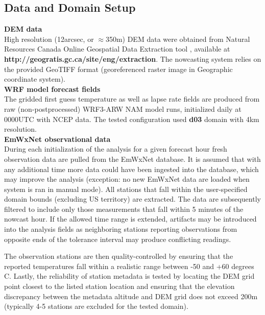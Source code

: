 \documentclass{article}
\begin{document}
\subsection{Data and Domain Setup}

\noindent \textbf{DEM data}\\
High resolution (12arcsec, or $\approx$350m) DEM data were obtained from Natural Resources Canada Online Geospatial Data Extraction tool \cite{DEMdata}, available at \textbf{http://geogratis.gc.ca/site/eng/extraction}. The nowcasting system relies on the provided GeoTIFF format (georeferenced raster image in Geographic coordinate system). \\

\vspace{0.1cm}
\noindent \textbf{WRF model forecast fields}\\
The gridded first guess temperature as well as lapse rate fields are produced from raw (non-postprocessed) WRF3-ARW NAM model runs, initialized daily at 0000UTC with NCEP data. The tested configuration used \textbf{d03} domain with 4km resolution. \\

\vspace{0.1cm}
\noindent \textbf{EmWxNet observational data}\\
During each initialization of the analysis for a given forecast hour fresh observation data are pulled from the EmWxNet database. It is assumed that with any additional time more data could have been ingested into the database, which may improve the analysis (exception: no new EmWxNet data are loaded when system is ran in manual mode). All stations that fall within the user-specified domain bounds (excluding US territory) are extracted. The data are subsequently filtered to include only those measurements that fall within 5 minutes of the nowcast hour. If the allowed time range is extended, artifacts may be introduced into the analysis fields as neighboring stations reporting observations from opposite ends of the tolerance interval may produce conflicting readings. 

The observation stations are then quality-controlled by ensuring that the reported temperatures fall within a realistic range between -50 and +60 degrees C. Lastly, the reliability of station metadata is tested by locating the DEM grid point closest to the listed station location and ensuring that the elevation discrepancy between the metadata altitude and DEM grid does not exceed 200m (typically 4-5 stations are excluded for the tested domain). 
\end{document}
